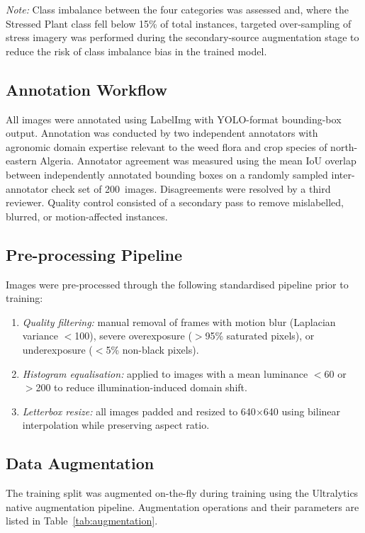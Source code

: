 \documentclass[12pt,a4paper]{report}
\begin{document}
\textit{Note:} Class imbalance between the four categories was assessed and, where the Stressed Plant class fell below 15\% of total instances, targeted over-sampling of stress imagery was performed during the secondary-source augmentation stage to reduce the risk of class imbalance bias in the trained model.

\subsection{Annotation Workflow}

All images were annotated using LabelImg with YOLO-format bounding-box output. Annotation was conducted by two independent annotators with agronomic domain expertise relevant to the weed flora and crop species of north-eastern Algeria. Annotator agreement was measured using the mean IoU overlap between independently annotated bounding boxes on a randomly sampled inter-annotator check set of 200~images. Disagreements were resolved by a third reviewer. Quality control consisted of a secondary pass to remove mislabelled, blurred, or motion-affected instances.

\subsection{Pre-processing Pipeline}

Images were pre-processed through the following standardised pipeline prior to training:
\begin{enumerate}
    \item \emph{Quality filtering:} manual removal of frames with motion blur (Laplacian variance $<$100), severe overexposure ($>$95\% saturated pixels), or underexposure ($<$5\% non-black pixels).
    \item \emph{Histogram equalisation:} applied to images with a mean luminance $<$60 or $>$200 to reduce illumination-induced domain shift.
    \item \emph{Letterbox resize:} all images padded and resized to 640$\times$640 using bilinear interpolation while preserving aspect ratio.
\end{enumerate}

\subsection{Data Augmentation}

The training split was augmented on-the-fly during training using the Ultralytics native augmentation pipeline. Augmentation operations and their parameters are listed in Table~\ref{tab:augmentation}.
\end{document}
